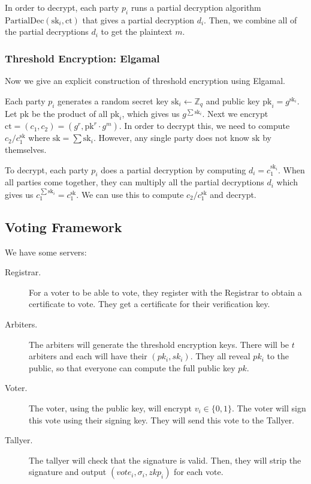 In order to decrypt, each party $p_i$ runs a partial decryption algorithm $\text{PartialDec}(\text{sk}_i, \text{ct})$ that gives a partial decryption $d_i$. Then, we combine all of the partial decryptions $d_i$ to get the plaintext $m$.

\subsubsection{Threshold Encryption: Elgamal}

Now we give an explicit construction of threshold encryption using Elgamal.

Each party $p_i$ generates a random secret key $\text{sk}_i \gets \mathbb{Z}_q$ and public key $\text{pk}_i = g^{\text{sk}_i}$. Let $\text{pk}$ be the product of all $\text{pk}_i$, which gives us $g^{\sum \text{sk}_i}$. Next we encrypt $\text{ct} = (c_1, c_2) = (g^r, \text{pk}^r \cdot g^m)$. In order to decrypt this, we need to compute $c_2 / c_1^{\text{sk}}$ where $\text{sk} = \sum \text{sk}_i$. However, any single party does not know $\text{sk}$ by themselves.

To decrypt, each party $p_i$ does a partial decryption by computing $d_i = c_1^{\text{sk}_i}$. When all parties come together, they can multiply all the partial decryptions $d_i$ which gives us $c_1^{\sum \text{sk}_i} = c_1 ^\text{sk}$. We can use this to compute $c_2 / c_1^\text{sk}$ and decrypt.

\subsection{Voting Framework}
We have some servers:
\begin{description}
    \item[Registrar.] For a voter to be able to vote, they register with the Registrar to obtain a certificate to vote. They get a certificate for their verification key.
    \item[Arbiters.] The arbiters will generate the threshold encryption keys. There will be $t$ arbiters and each will have their $(pk_i, sk_i)$. They all reveal $pk_i$ to the public, so that everyone can compute the full public key $pk$.
    \item[Voter.] The voter, using the public key, will encrypt $v_i \in\{0, 1\}$. The voter will sign this vote using their signing key. They will send this vote to the Tallyer.
    \item[Tallyer.] The tallyer will check that the signature is valid. Then, they will strip the signature and output $(vote_i, \sigma_i, zkp_i)$ for each vote.
\end{description}

